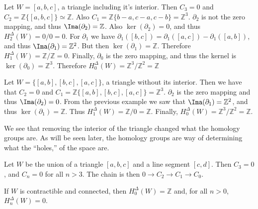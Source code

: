 \documentclass[crop=false,class=article,oneside]{standalone}
\begin{document}
            \begin{example}
                Let $W=[a,b,c]$, a triangle including it's interior.
                Then $C_{3}=0$ and
                $C_{2}=\mathbb{Z}\{[a,b,c]\}\simeq\mathbb{Z}$.
                Also $C_{1}=\mathbb{Z}\{b-a,c-a,c-b\}=\mathbb{Z}^{3}$.
                $\partial_{2}$ is not the zero mapping, and thus
                $\Ima(\partial_{2})=\mathbb{Z}$. Also $\ker(\partial_{2})=0$,
                and thus $H_{2}^{\Delta}(W)=0/0=0$. For $\partial_{1}$ we have
                $\partial_{1}([b,c])=\partial_{1}([a,c])-\partial_{1}([a,b])$,
                and thus $\Ima(\partial_{1})=\mathbb{Z}^{2}$. But then
                $\ker(\partial_{1})=\mathbb{Z}$. Therefore
                $H_{1}^{\Delta}(W)=\mathbb{Z}/\mathbb{Z}=0$.
                Finally, $\partial_{0}$ is the zero mapping, and
                thus the kernel is $\ker(\partial_{0})=\mathbb{Z}^{3}$.
                Therefore
                $H_{0}^{\Delta}(W)=\mathbb{Z}^{3}/\mathbb{Z}^{2}=\mathbb{Z}$
            \end{example}
            \begin{example}
                Let $W=\{[a,b],[b,c],[a,c]\}$, a triangle without
                its interior. Then we have that $C_{2}=0$ and
                $C_{1}=\mathbb{Z}\{[a,b],[b,c],[a,c]\}=\mathbb{Z}^{3}$.
                $\partial_{2}$ is the zero mapping and thus
                $\Ima(\partial_{2})=0$. From the previous example
                we saw that $\Ima(\partial_{1})=\mathbb{Z}^{2}$,
                and thus $\ker(\partial_{1})=\mathbb{Z}$.
                Thus $H_{1}^{\Delta}(W)=\mathbb{Z}/0=\mathbb{Z}$.
                Finally,
                $H_{0}^{\Delta}(W)=\mathbb{Z}^{3}/\mathbb{Z}^{2}=\mathbb{Z}$.
            \end{example}
            We see that removing the interior of the triangle changed what
            the homology groups are. As will be seen later, the homology
            groups are way of determining what the ``holes,''
            of the space are.
            \begin{example}
                Let $W$ be the union of a triangle $[a,b,c]$
                and a line segment $[c,d]$. Then $C_{3}=0$, and
                $C_{n}=0$ for all $n>3$. The chain is then
                $0\rightarrow{C_{2}}\rightarrow{C_{1}}\rightarrow{C_{0}}$.
            \end{example}
            \begin{theorem}
                If $W$ is contractible and connected,
                then $H_{0}^{\Delta}(W)=\mathbb{Z}$ and, for all
                $n>0$, $H_{n}^{\Delta}(W)=0$.
            \end{theorem}
            
\end{document}
